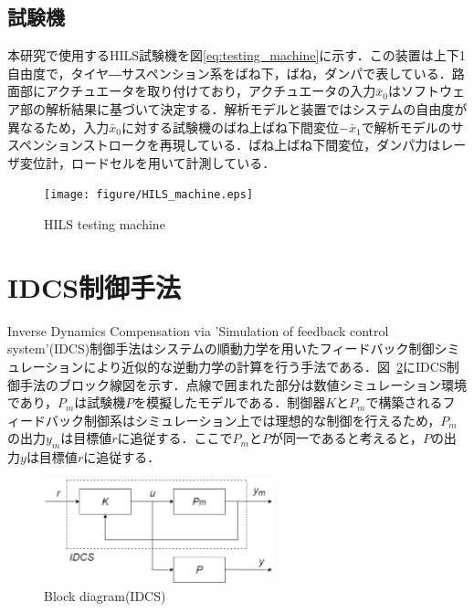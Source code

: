 \documentclass{article_vdlab_sotsuron_youshi}
\begin{document}
\vspace{2mm}
\subsection{試験機}
本研究で使用するHILS試験機を図\ref{eq:testing_machine}に示す．この装置は上下1自由度で，タイヤ―サスペンション系をばね下，ばね，ダンパで表している．路面部にアクチュエータを取り付けており，アクチュエータの入力$\bar{x}_0$はソフトウェア部の解析結果に基づいて決定する．解析モデルと装置ではシステムの自由度が異なるため，入力$\bar{x}_0$に対する試験機のばね上ばね下間変位$-\bar{x}_1$で解析モデルのサスペンションストロークを再現している．ばね上ばね下間変位，ダンパ力はレーザ変位計，ロードセルを用いて計測している．

\vspace{5mm}
\begin{figure}[H]
 \centering
 \texttt{[image: figure/HILS\_machine.eps]}
 \vspace{-8mm}
  \caption{HILS testing machine}
 \label{fig:testing_machine}
\end{figure}

\newpage
\section{IDCS制御手法}
Inverse Dynamics Compensation via 'Simulation of feedback control system'(IDCS)制御手法はシステムの順動力学を用いたフィードバック制御シミュレーションにより近似的な逆動力学の計算を行う手法である\cite{method_idcs}．図~\ref{fig:idcs_block}にIDCS制御手法のブロック線図を示す．点線で囲まれた部分は数値シミュレーション環境であり，$P_m$は試験機$P$を模擬したモデルである．制御器$K$と$P_m$で構築されるフィードバック制御系はシミュレーション上では理想的な制御を行えるため，$P_m$の出力$y_m$は目標値$r$に追従する．ここで$P_m$と$P$が同一であると考えると，$P$の出力$y$は目標値$r$に追従する．

\vspace*{3mm}
\begin{figure}[htp]
  \begin{center}
    \includegraphics[height=30mm]{figure/idcs_block.eps}
    \vspace*{1mm}
    \caption{Block diagram(IDCS)}
    \label{fig:idcs_block}
  \end{center}
\end{figure}
\end{document}
